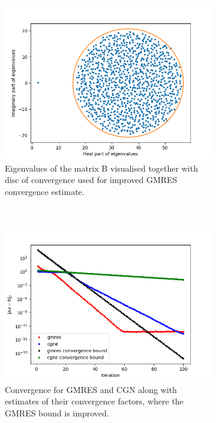 \begin{figure}[h!]
	\centering
	\begin{subfigure}[t]{0.49\textwidth}
		\includegraphics[width=\textwidth]{Eigens2.png}
		\caption{Eigenvalues of the matrix B visualised together with disc of convergence used for improved GMRES convergence estimate.}
	\end{subfigure}~
	\begin{subfigure}[t]{0.49\textwidth}
		\includegraphics[width=\textwidth]{error_itr2.png}
		\caption{Convergence for GMRES and CGN along with estimates of their convergence factors, where the GMRES bound is improved.}
	\end{subfigure}
	\caption{}
	\label{better}
\end{figure}

